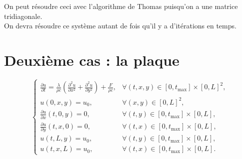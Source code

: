 \documentclass{article}
\begin{document}
\begin{center}
\end{center}
On peut résoudre ceci avec l'algorithme de Thomas puisqu'on a une matrice tridiagonale.\\On devra résoudre ce système autant de fois qu’il y a d’itérations en temps.

\newpage

\section{Deuxième cas : la plaque}

\begin{equation}
\begin{cases}
    \frac{\partial u}{\partial t} = \frac{\lambda}{\rho c} \left(\frac{\partial^2 u}{\partial x^2} + \frac{\partial^2 u}{\partial y^2}\right) + \frac{F}{\rho c}, & \forall (t, x, y) \in [0, t_{\text{max}}] \times [0, L]^2, \\
    u(0, x, y) = u_0, & \forall (x, y) \in [0, L]^2, \\
    \frac{\partial u}{\partial x}(t, 0, y) = 0, & \forall (t, y) \in [0, t_{\text{max}}] \times [0, L], \\
    \frac{\partial u}{\partial y}(t, x, 0) = 0, & \forall (t, x) \in [0, t_{\text{max}}] \times [0, L], \\
    u(t, L, y) = u_0, & \forall (t, y) \in [0, t_{\text{max}}] \times [0, L], \\
    u(t, x, L) = u_0, & \forall (t, x) \in [0, t_{\text{max}}] \times [0, L].
\end{cases}
\end{equation}
\end{document}
